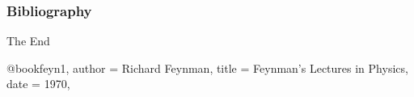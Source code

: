 \documentclass{beamer}
\theoremstyle{plain}
\theoremstyle{definition}
\theoremstyle{remark}
\numberwithin{equation}{section}
\numberwithin{figure}{section}
\numberwithin{theorem}{section}
\begin{document}
		
		
		
\begin{frame}
	\frametitle{Bibliography}
	\printbibliography
	\nocite{*}
\end{frame}

		
		
		\begin{frame}
			\Huge{\centerline{The End}}
		\end{frame}
		
		

@book{feyn1,
	author = {Richard Feynman},
	title = {Feynman's Lectures in Physics},
	date = {1970},
}
	
\end{document}
